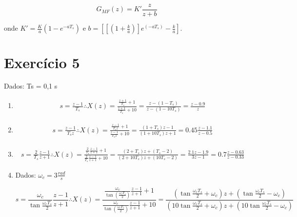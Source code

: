 \documentclass{article}
\begin{document}
\begin{equation}
G_{MF}(z) = K' \frac{z}{z+b}
\end{equation}

onde $K' = \frac{K}{a} (1-e^{-aT_s}) \mbox{ e } b = \left[\left[(1 + \frac{k}{a})\right]e^(-aT_s) - \frac{k}{a} \right] $.

\section*{Exercício 5} Dados: Ts = 0,1 s

\begin{enumerate}
\item %

\begin{equation}
\begin{split}
s = \frac{z - 1}{T_s} \therefore X(z) = \frac{\frac{z+1}{T_s} + 1}{\frac{z+1}{T_s} + 10} = \frac{z - (1-T_s)}{z - (1-10T_s)} = \frac{z - 0.9}{z} 
\end{split}
\end{equation}

\item %

\begin{equation}
\begin{split}
s = \frac{z - 1}{T_s z} \therefore X(z) = \frac{\frac{z-1}{T_s z} + 1}{\frac{z-1}{T_s z} + 10} = \frac{(1+T_s) z - 1}{(1 + 10T_s) z + 1} = 0.45 \frac{z - 1.1}{z - 0.5}
\end{split}
\end{equation}

\item %

\begin{equation}
\begin{split}
s = \frac{2}{T_s} \frac{z - 1}{z+1} \therefore X(z) = \frac{\frac{2}{T_s} \frac{z-1}{z+1} + 1}{\frac{2}{T_s} \frac{z-1}{z+1} + 10} = \frac{(2+T_s)z + (T_s - 2)}{(2 + 10T_s) z + (10 T_s - 2)} = \frac{2.1z - 1.9}{3z - 1} = 0.7\frac{z-0.63}{z-0.33}
\end{split}
\end{equation}

\item %
Dados: $\omega_c = 3 \frac{rad}{s}$

\begin{equation}
s = \frac{\omega_c}{\tan{\frac{\omega_c T_s}{2}}} \frac{z-1}{z+1} \therefore X(z) = \frac{\frac{\omega_c}{\tan(\frac{\omega_c T_s}{2})} \frac{z-1}{z+1} + 1}{\frac{\omega_c}{\tan(\frac{\omega_c T_s}{2})} \frac{z-1}{z+1} + 10} = \frac{(\tan{\frac{\omega_c T_s}{2}} + \omega_c) z + (\tan{\frac{\omega_c T_s}{2}} - \omega_c)}{(10 \tan{\frac{\omega_c T_s}{2}} + \omega_c) z + (10 \tan{\frac{\omega_c T_s}{2}} - \omega_c)} 
\end{equation}


\end{enumerate}
\end{document}
